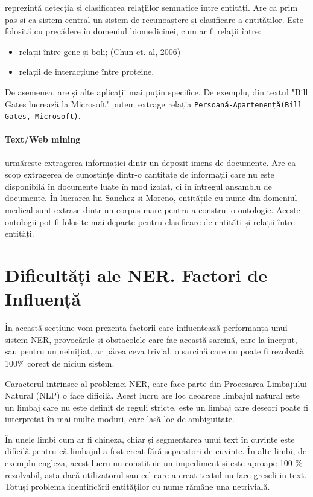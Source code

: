 reprezintă detecția și clasificarea relațiilor semnatice între entități. Are ca prim pas și ca sistem central un sistem de recunoaștere și clasificare a entităților. Este folosită cu precădere în domeniul biomedicinei, cum ar fi relații între:

\begin{itemize}
\item relații între gene și boli; (Chun et. al, 2006)\cite{Chun06extractionof}
\item relații de interacțiune între proteine.
\end{itemize}

De asemenea, are și alte aplicații mai puțin specifice. De exemplu, din textul "Bill Gates lucrează la Microsoft" putem extrage relația \texttt{Persoană-Apartenență(Bill Gates, Microsoft)}.

\paragraph{Text/Web mining}

urmărește extragerea informației dintr-un depozit imens de documente. Are ca scop extragerea de cunoștințe dintr-o cantitate de informații care nu este disponibilă în documente luate în mod izolat, ci în întregul ansamblu de documente. În lucrarea lui Sanchez și Moreno, entitățile cu nume din domeniul medical sunt extrase dintr-un corpus mare pentru a construi o ontologie. Aceste ontologii pot fi folosite mai departe pentru clasificare de entități și relații între entități.\cite{sanchez2005}

\section{Dificultăți ale NER. Factori de Influență}

În această secțiune vom prezenta factorii care influențează performanța unui sistem NER, provocările și obstacolele care fac această sarcină, care la început, sau pentru un neinițiat, ar părea ceva trivial, o sarcină care nu poate fi rezolvată 100\% corect de niciun sistem.


Caracterul intrinsec al problemei NER, care face parte din Procesarea Limbajului Natural (NLP) o face dificilă. Acest lucru are loc deoarece limbajul natural este un limbaj care nu este definit de reguli stricte, este un limbaj care deseori poate fi interpretat în mai multe moduri, care lasă loc de ambiguitate.

În unele limbi cum ar fi chineza, chiar și segmentarea unui text în cuvinte este dificilă pentru că limbajul a fost creat fără separatori de cuvinte. În alte limbi, de exemplu engleza, acest lucru nu constituie un impediment și este aproape 100 \% rezolvabil, asta dacă utilizatorul sau cel care a creat textul nu face greșeli in text. Totuși problema identificării entităților cu nume rămâne una netrivială.

